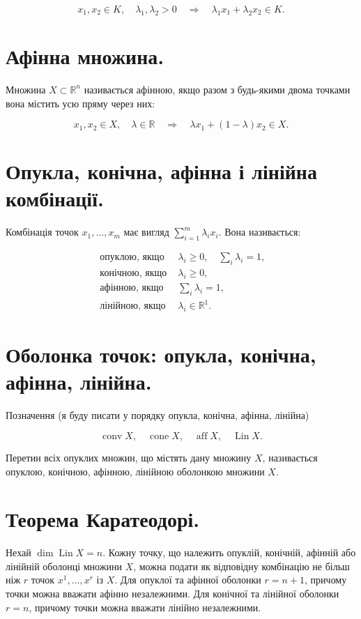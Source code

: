 \documentclass[10pt]{article}
\begin{document}
$$
x_{1}, x_{2} \in K, \quad \lambda_{1}, \lambda_{2}>0 \quad \Longrightarrow \quad \lambda_{1} x_{1}+\lambda_{2} x_{2} \in K .
$$

\section*{Афінна множина.}
Множина $X \subset \mathbb{R}^{n}$ називається афінною, якщо разом з будь-якими двома точками вона містить усю пряму через них:

$$
x_{1}, x_{2} \in X, \quad \lambda \in \mathbb{R} \quad \Longrightarrow \quad \lambda x_{1}+(1-\lambda) x_{2} \in X .
$$

\section*{Опукла, конічна, афінна і лінійна комбінації.}
Комбінація точок $x_{1}, \ldots, x_{m}$ має вигляд $\sum_{i=1}^{m} \lambda_{i} x_{i}$. Вона називається:

$$
\begin{array}{ll}
\text { опуклою, якщо } & \lambda_{i} \geq 0, \quad \sum_{i} \lambda_{i}=1, \\
\text { конічною, якщо } & \lambda_{i} \geq 0, \\
\text { афінною, якщо } & \sum_{i} \lambda_{i}=1, \\
\text { лінійною, якщо } & \lambda_{i} \in \mathbb{R}^{1} .
\end{array}
$$

\section*{Оболонка точок: опукла, конічна, афінна, лінійна.}
Позначення (я буду писати у порядку опукла, конічна, афінна, лінійна)

$$
\operatorname{conv} X, \quad \operatorname{cone} X, \quad \operatorname{aff} X, \quad \operatorname{Lin} X .
$$

Перетин всіх опуклих множин, що містять дану множину $X$, називається опуклою, конічною, афінною, лінійною оболонкою множини $X$.

\section*{Теорема Каратеодорі.}
Нехай $\operatorname{dim} \operatorname{Lin} X=n$. Кожну точку, що належить опуклій, конічній, афінній або лінійній оболонці множини $X$, можна подати як відповідну комбінацію не більш ніж $r$ точок $x^{1}, \ldots, x^{r}$ із $X$. Для опуклої та афінної оболонки $r=n+1$, причому точки можна вважати афінно незалежними. Для конічної та лінійної оболонки $r=n$, причому точки можна вважати лінійно незалежними.
\end{document}
